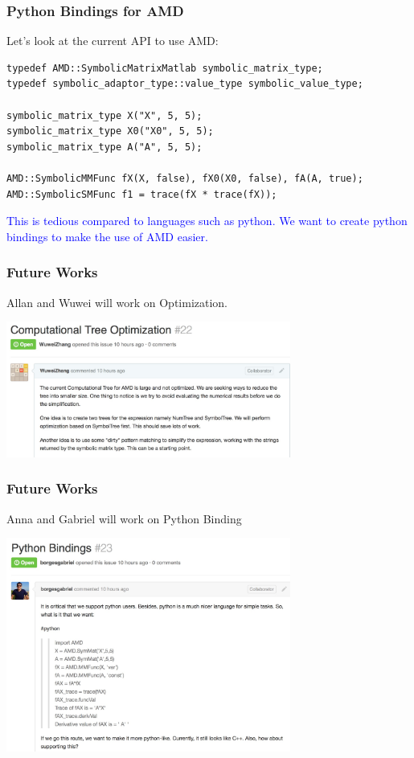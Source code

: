 \begin{frame}[fragile]
\frametitle{Python Bindings for AMD}
%
Let's look at the current API to use AMD:
%
\begin{lstlisting}[style=basic]
typedef AMD::SymbolicMatrixMatlab symbolic_matrix_type;
typedef symbolic_adaptor_type::value_type symbolic_value_type;

symbolic_matrix_type X("X", 5, 5); 
symbolic_matrix_type X0("X0", 5, 5); 
symbolic_matrix_type A("A", 5, 5);

AMD::SymbolicMMFunc fX(X, false), fX0(X0, false), fA(A, true);
AMD::SymbolicSMFunc f1 = trace(fX * trace(fX));
\end{lstlisting}

%
\begin{center}
\textcolor{blue}{This is tedious compared to languages such as python. We want
to create python bindings to make the use of AMD easier.}
\end{center}
%
\end{frame}

\begin{frame}[fragile]
\frametitle{Future Works}
%
Allan and Wuwei will work on Optimization.
\begin{center}
\includegraphics[width=0.7\textwidth]{figs/optimizationIssue.jpg}
\end{center}%
\end{frame}

\begin{frame}[fragile]
\frametitle{Future Works}
%
Anna and Gabriel will work on Python Binding
\begin{center}
\includegraphics[width=0.7\textwidth]{figs/pythonBindIssue.jpg}
\end{center}%
\end{frame}
